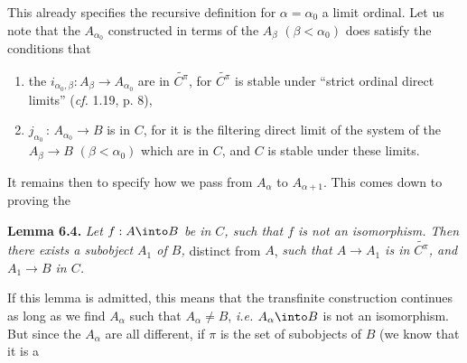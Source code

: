 This already specifies the recursive definition for $\alpha = \alpha_{0}$ a limit ordinal. Let us note that the $A_{\alpha_{0}}$ constructed in terms of the $A_{\beta}$ $(\beta < \alpha_{0})$ does satisfy the conditions that
\begin{enumerate}[label={}]
\item[\textit{a})] the $i_{\alpha_{0},\beta} : A_{\beta} \longrightarrow A_{\alpha_{0}}$ are in $\widetilde{C^{\pi}}$, for $\widetilde{C^{\pi}}$ is stable under ``strict ordinal direct limits'' (\textit{cf.} 1.19, p. 8),
\item[\textit{b})] $j_{\alpha_{0}} \, : \, A_{\alpha_{0}} \longrightarrow B$ is in $C$, for it is the filtering direct limit of the system of the $A_{\beta} \longrightarrow B$ $(\beta < \alpha_{0})$ which are in $C$, and $C$ is stable under these limits.
\end{enumerate}
It remains then to specify how we pass from $A_{\alpha}$ to $A_{\alpha+1}$. This comes down to proving the

\textbf{Lemma 6.4.} \textit{Let $f : A \into B$ be in $C$, such that $f$ is not an isomorphism. Then there exists a subobject $A_{1}$ of $B$,} distinct from $A$, \textit{such that $A \longrightarrow A_{1}$ is in $\widetilde{C^{\pi}}$, and $A_{1} \longrightarrow B$ in $C$.}

If this lemma is admitted, this means that the transfinite construction continues as long as we find $A_{\alpha}$ such that $A_{\alpha} \neq B$, \textit{i.e.} $A_{\alpha} \into B$ is not an isomorphism. But since the $A_{\alpha}$ are all different, if $\pi$ is the set of subobjects of $B$ (we know that it is a